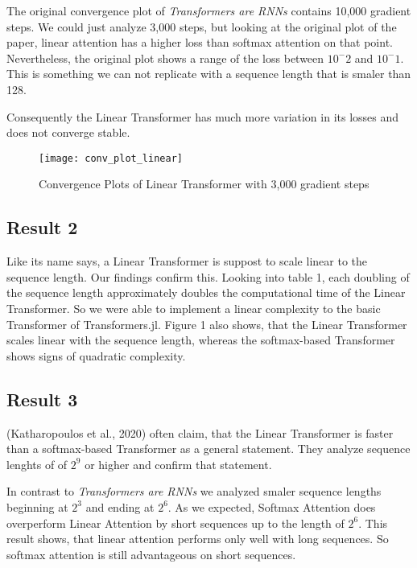 \documentclass[DIV=13,fontsize=11pt]{scrartcl}
\begin{document}
The original convergence plot of  \textit{Transformers are RNNs} contains 10,000 gradient steps. We could just analyze 3,000 steps, but looking at the original plot of the paper, linear attention has a higher loss than softmax attention on that point. Nevertheless, the original plot shows a range of the loss between \(10^-2\) and  \(10^-1\).  This is something we can not replicate with a sequence length that is smaler than 128.

Consequently the Linear Transformer has much more variation in its losses and does not converge stable. 

\begin{figure}[h]
    \centering
    \texttt{[image: conv\_plot\_linear]}
    \caption{Convergence Plots of Linear Transformer with 3,000 gradient steps}
    \label{fig:mesh1}
\end{figure}

\subsection{Result 2}
Like its name says, a Linear Transformer is suppost to scale linear to the sequence length. Our findings confirm this. Looking into table 1, each doubling of the sequence length approximately
doubles the computational time of the Linear Transformer. So we were able to implement a linear complexity to the basic Transformer of Transformers.jl. 
Figure 1 also shows, that the Linear Transformer scales linear with the sequence length, whereas the softmax-based Transformer shows signs of quadratic complexity.


\subsection{Result 3}
(Katharopoulos et al., 2020) often claim, that the Linear Transformer is faster than a softmax-based Transformer as a general statement. They analyze sequence lenghts of of \(2^9\) or higher and confirm that statement. 

In contrast to \textit{Transformers are RNNs} we analyzed smaler sequence lengths beginning at  \(2^3\) and ending at \(2^6\).  As we expected, Softmax Attention does overperform Linear Attention by short sequences up to the length of \(2^6\). This result shows, that linear attention performs only well with long sequences.  So softmax attention is still advantageous on short sequences.
\end{document}
